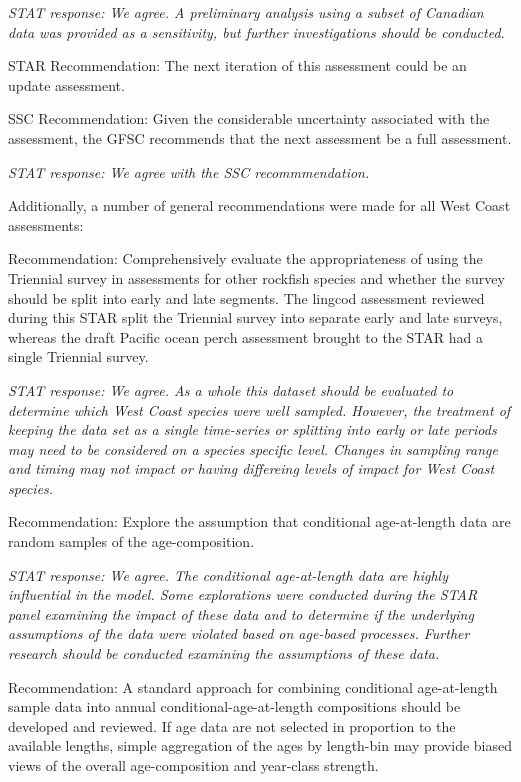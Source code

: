 \documentclass[12pt,]{article}
\begin{document}
\emph{STAT response: We agree. A preliminary analysis using a subset of
Canadian data was provided as a sensitivity, but further investigations
should be conducted.}

STAR Recommendation: The next iteration of this assessment could be an
update assessment.

SSC Recommendation: Given the considerable uncertainty associated with
the assessment, the GFSC recommends that the next assessment be a full
assessment.

\emph{STAT response: We agree with the SSC recommmendation.}

Additionally, a number of general recommendations were made for all West
Coast assessments:

Recommendation: Comprehensively evaluate the appropriateness of using
the Triennial survey in assessments for other rockfish species and
whether the survey should be split into early and late segments. The
lingcod assessment reviewed during this STAR split the Triennial survey
into separate early and late surveys, whereas the draft Pacific ocean
perch assessment brought to the STAR had a single Triennial survey.

\emph{STAT response: We agree. As a whole this dataset should be
evaluated to determine which West Coast species were well sampled.
However, the treatment of keeping the data set as a single time-series
or splitting into early or late periods may need to be considered on a
species specific level. Changes in sampling range and timing may not
impact or having differeing levels of impact for West Coast species.}

Recommendation: Explore the assumption that conditional age-at-length
data are random samples of the age-composition.

\emph{STAT response: We agree. The conditional age-at-length data are
highly influential in the model. Some explorations were conducted during
the STAR panel examining the impact of these data and to determine if
the underlying assumptions of the data were violated based on age-based
processes. Further research should be conducted examining the
assumptions of these data.}

Recommendation: A standard approach for combining conditional
age-at-length sample data into annual conditional-age-at-length
compositions should be developed and reviewed. If age data are not
selected in proportion to the available lengths, simple aggregation of
the ages by length-bin may provide biased views of the overall
age-composition and year-class strength.
\end{document}
